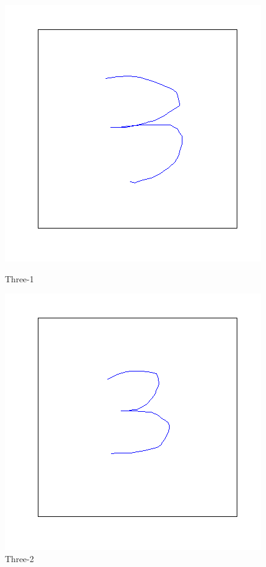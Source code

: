 \documentclass[a4paper, 10pt]{article}
\begin{document}
\begin{figure}[ht]
\begin{minipage}[b]{0.45\linewidth}
\centering
\includegraphics[width=\textwidth]{figs/3-1}
\caption{Three-1}
\label{fig:figure1}
\end{minipage}
\hspace{0.5cm}
\begin{minipage}[b]{0.45\linewidth}
\centering
\includegraphics[width=\textwidth]{figs/3-2}
\caption{Three-2}
\label{fig:figure2}
\end{minipage}
\end{figure}
\end{document}
